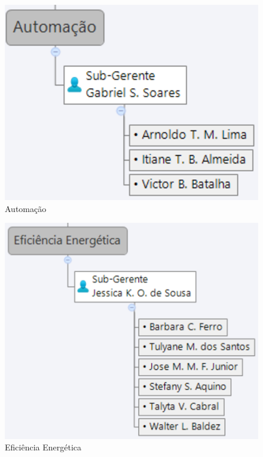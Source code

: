 \begin{figure}[H]
  \begin{center}
	\includegraphics[keepaspectratio,scale=0.6]{figuras/automacao.eps}
	\caption{Automação}
  \end{center}
\end{figure}

\begin{figure}[H]
  \begin{center}
	\includegraphics[keepaspectratio,scale=0.6]{figuras/eficiencia_energetica.eps}
	\caption{Eficiência Energética}
  \end{center}
\end{figure}

